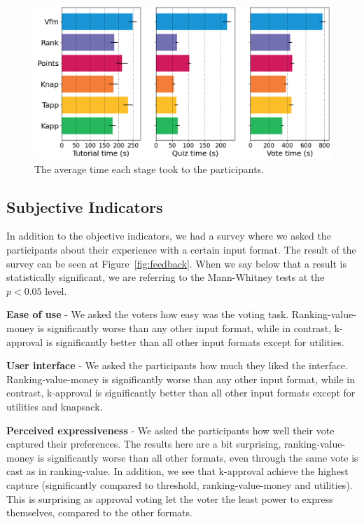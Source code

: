 \documentclass[10pt]{article}
\newcommand{\kibitz}[2]{\ifnum\Comments=1{\color{#1}{#2}}\fi}
\newcommand{\gb}[1]{\kibitz{green}{[GB:#1]}}
\begin{document}
\begin{figure}[!htbp]
\begin{center}
\includegraphics[width=15cm]{experiment/time.png}
\caption{The average time each stage took to the participants.
}\label{fig:time}
\end{center}
\end{figure}

\subsection{Subjective Indicators}
In addition to the objective indicators, we had a survey where we asked the participants about their experience with a certain input format. The result of the survey can be seen at Figure~\ref{fig:feedback}.
When we say below that a result is statistically significant, we are referring to the Mann-Whitney tests at the $p < 0.05$ level. 


\textbf{Ease of use} - We asked the voters how easy was the voting task. Ranking-value-money is significantly worse than any other input format, while in contrast, k-approval is significantly better than all other input formats except for utilities. 

\textbf{User interface} - We asked the participants how much they liked the interface. Ranking-value-money is significantly worse than any other input format, while in contrast, k-approval is significantly better than all other input formats except for utilities and knapsack.

\textbf{Perceived expressiveness} - We asked the participants how well their vote captured their preferences. The results here are a bit surprising, ranking-value-money is significantly worse than all other formats, even through the same vote is cast as in ranking-value. In addition, we see that k-approval achieve the highest capture (significantly compared to threshold, ranking-value-money and utilities). This is surprising as approval voting let the voter the least power to express themselves, compared to the other formats.
\end{document}

